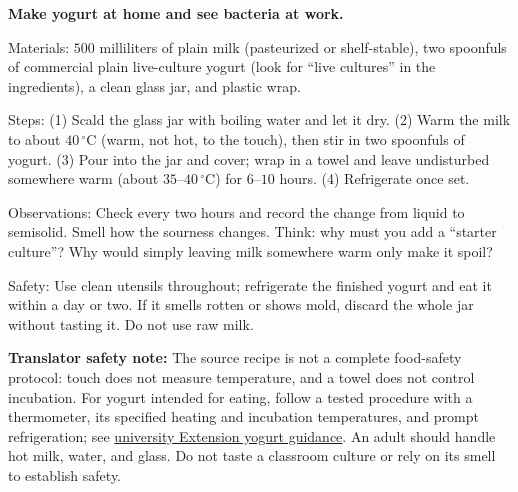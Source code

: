 \begin{center}
\end{center}

\begin{shiyan}
\textbf{Make yogurt at home and see bacteria at work.}

Materials: $500$ milliliters of plain milk (pasteurized or shelf-stable), two spoonfuls of commercial plain live-culture yogurt (look for ``live cultures'' in the ingredients), a clean glass jar, and plastic wrap.

Steps: (1) Scald the glass jar with boiling water and let it dry. (2) Warm the milk to about $40\,^{\circ}\mathrm{C}$ (warm, not hot, to the touch), then stir in two spoonfuls of yogurt. (3) Pour into the jar and cover; wrap in a towel and leave undisturbed somewhere warm (about $35$--$40\,^{\circ}\mathrm{C}$) for $6$--$10$ hours. (4) Refrigerate once set.

Observations: Check every two hours and record the change from liquid to semisolid. Smell how the sourness changes. Think: why must you add a ``starter culture''? Why would simply leaving milk somewhere warm only make it spoil?

Safety: Use clean utensils throughout; refrigerate the finished yogurt and eat it within a day or two. If it smells rotten or shows mold, discard the whole jar without tasting it. Do not use raw milk.
\end{shiyan}

\textbf{Translator safety note:} The source recipe is not a complete food-safety protocol: touch does not measure temperature, and a towel does not control incubation. For yogurt intended for eating, follow a tested procedure with a thermometer, its specified heating and incubation temperatures, and prompt refrigeration; see \href{https://extension.oregonstate.edu/sites/default/files/documents/8836/fs173emakingyogurt.pdf}{university Extension yogurt guidance}. An adult should handle hot milk, water, and glass. Do not taste a classroom culture or rely on its smell to establish safety.

